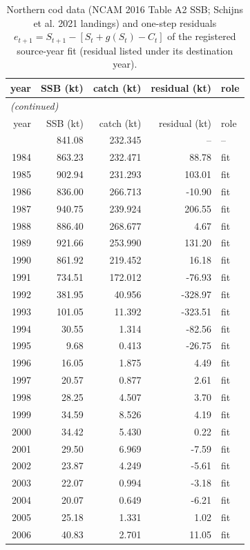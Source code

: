 \begingroup\footnotesize\setlength{\tabcolsep}{3pt}
\begin{longtable}{rrrrl}
\caption{Northern cod data (NCAM 2016 Table A2 SSB; Schijns et al. 2021 landings) and one-step residuals $e_{t+1}=S_{t+1}-[S_t+g(S_t)-C_t]$ of the registered source-year fit (residual listed under its destination year).}\label{tab:si-cod-data}\\
\toprule
year & SSB (kt) & catch (kt) & residual (kt) & role \\
\midrule
\endfirsthead
\multicolumn{5}{l}{\emph{(continued)}}\\
\toprule
year & SSB (kt) & catch (kt) & residual (kt) & role \\
\midrule
\endhead
\bottomrule
\endfoot
1983 & 841.08 & 232.345 & -- & -- \\
1984 & 863.23 & 232.471 & 88.78 & fit \\
1985 & 902.94 & 231.293 & 103.01 & fit \\
1986 & 836.00 & 266.713 & -10.90 & fit \\
1987 & 940.75 & 239.924 & 206.55 & fit \\
1988 & 886.40 & 268.677 & 4.67 & fit \\
1989 & 921.66 & 253.990 & 131.20 & fit \\
1990 & 861.92 & 219.452 & 16.18 & fit \\
1991 & 734.51 & 172.012 & -76.93 & fit \\
1992 & 381.95 & 40.956 & -328.97 & fit \\
1993 & 101.05 & 11.392 & -323.51 & fit \\
1994 & 30.55 & 1.314 & -82.56 & fit \\
1995 & 9.68 & 0.413 & -26.75 & fit \\
1996 & 16.05 & 1.875 & 4.49 & fit \\
1997 & 20.57 & 0.877 & 2.61 & fit \\
1998 & 28.25 & 4.507 & 3.70 & fit \\
1999 & 34.59 & 8.526 & 4.19 & fit \\
2000 & 34.42 & 5.430 & 0.22 & fit \\
2001 & 29.50 & 6.969 & -7.59 & fit \\
2002 & 23.87 & 4.249 & -5.61 & fit \\
2003 & 22.07 & 0.994 & -3.18 & fit \\
2004 & 20.07 & 0.649 & -6.21 & fit \\
2005 & 25.18 & 1.331 & 1.02 & fit \\
2006 & 40.83 & 2.701 & 11.05 & fit \\

\end{longtable}
